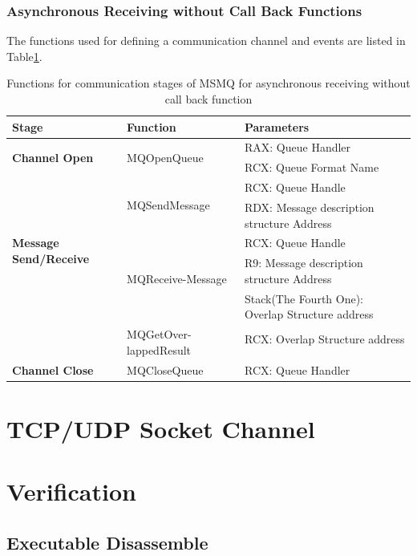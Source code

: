 \subsubsection{Asynchronous Receiving without Call Back Functions}
The functions used for defining a communication channel and events are listed in Table\ref{msmqasynfunctions}.
    \begin{table}[h]
        \centering
        \caption{Functions for communication stages of MSMQ for asynchronous receiving without call back function}
        \label{msmqasynfunctions}
        \begin{tabular}{|l|l|l|}
            \hline
             \textbf{Stage} & \textbf{Function}& \textbf{Parameters}  \\
             \hline
             \multirow{2}{*}{{\textbf{Channel Open}}}
             &\multirow{2}{*}{{MQOpenQueue}} &  RAX: Queue Handler\\
              \cline{3-3} 
             & &  RCX: Queue Format Name\\
            \hline
             \multirow{5}{*}{\parbox{2.5cm}{\textbf{Message Send/Receive}}}
             &\multirow{2}{*}{MQSendMessage} &  RCX: Queue Handle \\
              \cline{3-3} 
             &&  RDX: Message description structure Address \\
            \cline{2-3}
             & \multirow{3}{*}{\parbox{2.5cm}{MQReceive-Message}}&  RCX: Queue Handle \\
              \cline{3-3} 
              &&  R9: Message description structure Address \\
                            \cline{3-3} 
              &&  Stack(The Fourth One): Overlap Structure address\\
                          \cline{2-3}
                          
              & \multirow{2}{*}{\parbox{2.5cm}{MQGetOver-lappedResult}} &  RCX: Overlap Structure address  \\
              &&\\
            \hline
            \textbf{Channel Close} &MQCloseQueue & RCX: Queue Handler \\
            \hline
        \end{tabular}
    \end{table}
\section{TCP/UDP Socket Channel}


\section{Verification}
\subsection{Executable Disassemble}


